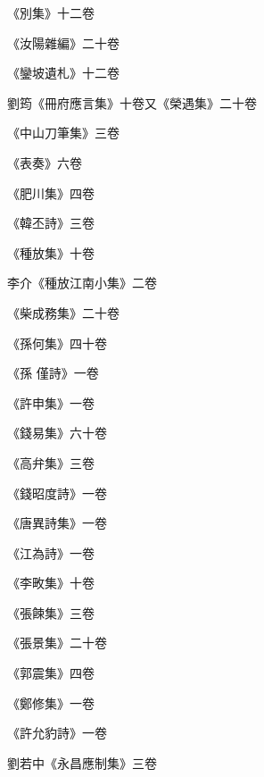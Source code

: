 \begin{pinyinscope}
 《別集》十二卷



 《汝陽雜編》二十卷



 《鑾坡遺札》十二卷



 劉筠《冊府應言集》十卷又《榮遇集》二十卷



 《中山刀筆集》三卷



 《表奏》六卷



 《肥川集》四卷



 《韓丕詩》三卷



 《種放集》十卷



 李介《種放江南小集》二卷



 《柴成務集》二十卷



 《孫何集》四十卷



 《孫
 僅詩》一卷



 《許申集》一卷



 《錢易集》六十卷



 《高弁集》三卷



 《錢昭度詩》一卷



 《唐異詩集》一卷



 《江為詩》一卷



 《李畋集》十卷



 《張餗集》三卷



 《張景集》二十卷



 《郭震集》四卷



 《鄭修集》一卷



 《許允豹詩》一卷



 劉若中《永昌應制集》三卷




\end{pinyinscope}
